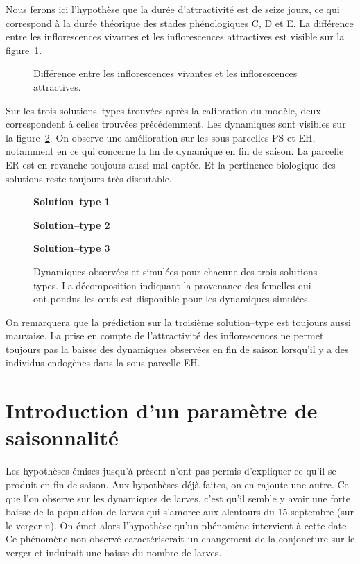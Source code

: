 Nous ferons ici l'hypothèse que la durée d'attractivité est de seize jours, ce qui correspond à la durée théorique des stades phénologiques C, D et E.
La différence entre les inflorescences vivantes et les inflorescences attractives est visible sur la figure~\ref{fig:CDE}.

\begin{figure}[ht]
 \centering
 \caption{Différence entre les inflorescences vivantes et les inflorescences attractives.}
 \label{fig:CDE}
\end{figure}


Sur les trois solutions--types trouvées après la calibration du modèle, deux correspondent à celles trouvées précédemment.
Les dynamiques sont visibles sur la figure~\ref{fig:C}.
On observe une amélioration sur les sous-parcelles PS et EH, notamment en ce qui concerne la fin de dynamique en fin de saison.
La parcelle ER est en revanche toujours aussi mal captée.
Et la pertinence biologique des solutions reste toujours très discutable.
\begin{figure}[ht]
 \centering
 
  \centering
 \textbf{Solution--type 1}
 
 
 \textbf{Solution--type 2}
 
 
 \textbf{Solution--type 3}
 
 
 
 \caption{Dynamiques observées et simulées pour chacune des trois solutions--types. La décomposition indiquant la provenance des femelles qui ont pondus les œufs est disponible pour les dynamiques simulées.}
 \label{fig:C}
\end{figure}


On remarquera que la prédiction sur la troisième solution--type est toujours aussi mauvaise.
La prise en compte de l'attractivité des inflorescences ne permet toujours pas la baisse des dynamiques observées en fin de saison lorsqu'il y a des individus endogènes dans la sous-parcelle EH.

\clearpage
\section{Introduction d'un paramètre de saisonnalité}

Les hypothèses émises jusqu'à présent n'ont pas permis d'expliquer ce qu'il se produit en fin de saison.
Aux hypothèses déjà faites, on en rajoute une autre.
Ce que l'on observe sur les dynamiques de larves, c'est qu'il semble y avoir une forte baisse de la population de larves qui s'amorce aux alentours du 15 septembre (sur le verger n).
On émet alors l'hypothèse qu'un phénomène intervient à cette date.
Ce phénomène non-observé caractériserait un changement de la conjoncture sur le verger et induirait une baisse du nombre de larves.

